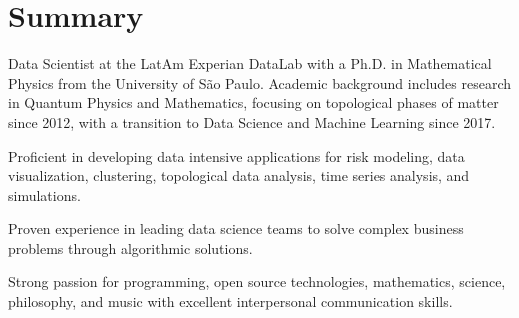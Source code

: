 \documentclass[11pt,a4paper,sans]{moderncv}        %
\begin{document}
\makecvtitle

\section{Summary}

\begin{itemize} 
Data Scientist at the LatAm Experian DataLab with a Ph.D. in Mathematical Physics from the University of São Paulo. Academic background includes research in Quantum Physics and Mathematics, focusing on topological phases of matter since 2012, with a transition to Data Science and Machine Learning since 2017.

Proficient in developing data intensive applications for risk modeling, data visualization, clustering, topological data analysis, time series analysis, and simulations.

Proven experience in leading data science teams to solve complex business problems through algorithmic solutions.

Strong passion for programming, open source technologies, mathematics, science, philosophy, and music with excellent interpersonal communication skills.
\end{itemize}
\end{document}
